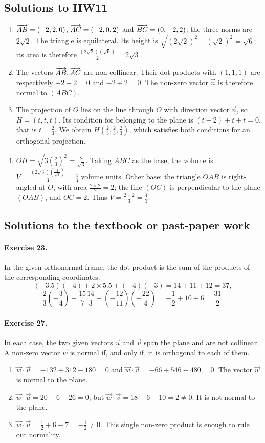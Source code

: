 \subsection{Solutions to HW11}\begin{enumerate}
\item $\overrightarrow{AB}=(-2,2,0)$, $\overrightarrow{AC}=(-2,0,2)$ and $\overrightarrow{BC}=(0,-2,2)$; the three norms are $2\sqrt2$. The triangle is equilateral. Its height is $\sqrt{(2\sqrt2)^2-(\sqrt2)^2}=\sqrt6$; its area is therefore $\frac{(2\sqrt2)(\sqrt6)}{2}=2\sqrt{3}$.
\item The vectors $\overrightarrow{AB},\overrightarrow{AC}$ are non-collinear. Their dot products with $(1,1,1)$ are respectively $-2+2=0$ and $-2+2=0$. The non-zero vector $\vec n$ is therefore normal to $(ABC)$.
\item The projection of $O$ lies on the line through $O$ with direction vector $\vec n$, so $H=(t,t,t)$. Its condition for belonging to the plane is $(t-2)+t+t=0$, that is $t=\frac{2}{3}$. We obtain $H(\frac{2}{3},\frac{2}{3},\frac{2}{3})$, which satisfies both conditions for an orthogonal projection.
\item $OH=\sqrt{3(\frac{2}{3})^2}=\frac{2}{\sqrt{3}}$. Taking $ABC$ as the base, the volume is $V=\frac{(2\sqrt3)(\frac{2}{\sqrt{3}})}{3}=\frac{4}{3}$ volume units. Other base: the triangle $OAB$ is right-angled at $O$, with area $\frac{2\times2}{2}=2$; the line $(OC)$ is perpendicular to the plane $(OAB)$, and $OC=2$. Thus $V=\frac{2\times2}{3}=\frac{4}{3}$.
\end{enumerate}

\subsection{Solutions to the textbook or past-paper work}\paragraph{Exercise 23.} In the given orthonormal frame, the dot product is the sum of the products of the corresponding coordinates:
\[(-3.5)(-4)+2\times5.5+(-4)(-3)=14+11+12=37,\]
\[\frac23\left(-\frac34\right)+\frac{15}7\frac{14}3+\left(-\frac{12}{11}\right)\left(-\frac{22}4\right)=-\frac12+10+6=\frac{31}2.\]
\paragraph{Exercise 27.} In each case, the two given vectors $\vec u$ and $\vec v$ span the plane and are not collinear. A non-zero vector $\vec w$ is normal if, and only if, it is orthogonal to each of them.
\begin{enumerate}
\item $\vec w\cdot\vec u=-132+312-180=0$ and $\vec w\cdot\vec v=-66+546-480=0$. The vector $\vec w$ is normal to the plane.
\item $\vec w\cdot\vec u=20+6-26=0$, but $\vec w\cdot\vec v=18-6-10=2\ne0$. It is not normal to the plane.
\item $\vec w\cdot\vec u=\frac12+6-7=-\frac12\ne0$. This single non-zero product is enough to rule out normality.
\end{enumerate}

\fi
